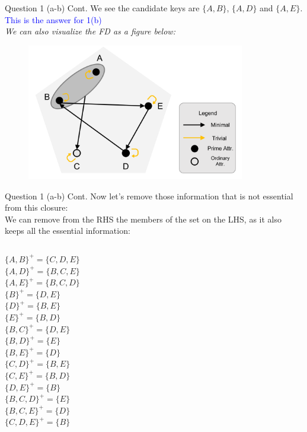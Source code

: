 \begin{frame}[fragile]{Question 1 (a-b) Cont.}
	We see the candidate keys are $\{A,B\}$, $\{A,D\}$ and $\{A,E\}$.\\
	\textcolor{blue}{This is the answer for 1(b)}\\
	\vspace{15pt}
	\textit{We can also visualize the FD as a figure below:}\\
	\begin{figure}
		\includegraphics[width=0.85\textwidth, trim=0 0 0 0, clip]{4221-t3/images/q1.png}
	\end{figure}
\end{frame}

\begin{frame}[fragile]{Question 1 (a-b) Cont.}
	Now let's remove those information that is not essential from this closure:\\\vspace{3pt}
	We can remove from the RHS the members of the set on the LHS, as it also keeps all the essential information:\\\vspace{6pt}
	\begin{columns}[t]
		$\{A, B\}^{+}= \{C, D, E\}$\\
		$\{A, D\}^{+}= \{B, C, E\}$\\
		$\{A, E\}^{+}= \{B, C, D\}$\\
		$\{B\}^{+}= \{D, E\}$\\
		$\{D\}^{+}= \{B, E\}$\\
		$\{E\}^{+}= \{B, D\}$\\ 
		$\{B, C\}^{+}= \{D, E\}$\\
		$\{B, D\}^{+}= \{E\}$\\
		$\{B, E\}^{+}= \{D\}$\\
		$\{C, D\}^{+}= \{B, E\}$\\
		$\{C, E\}^{+}= \{B, D\}$\\
		$\{D, E\}^{+}= \{B\}$\\
		$\{B, C, D\}^{+}= \{E\}$\\
		$\{B, C, E\}^{+}= \{D\}$\\
		$\{C, D, E\}^{+}= \{B\}$		
	\end{columns}
\end{frame}

